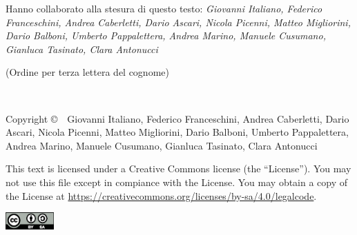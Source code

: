 \documentclass[a4paper,oneside,notoc]{tufte-book}
\theoremstyle{importante}
\begin{document}
\newpage
\newcommand{\contributori}{Giovanni Italiano, Federico Franceschini,
  Andrea Caberletti, Dario Ascari, Nicola Picenni, Matteo Migliorini,
  Dario Balboni, Umberto Pappalettera, Andrea Marino, Manuele Cusumano,
  Gianluca Tasinato, Clara Antonucci}
\begin{fullwidth}
\begin{doublespace}
  \thispagestyle{empty}
  \setlength{\parindent}{0pt}
  \setlength{\parskip}{\baselineskip}
  {\justify
  \noindent\fontsize{16}{16}\selectfont\scshape
  \par\nohyphenation\noindent Hanno collaborato alla stesura di questo testo:
  \itshape\contributori

  (Ordine per terza lettera del cognome)
  }
\end{doublespace}

~\vfill
\thispagestyle{empty}
\setlength{\parindent}{0pt}
\setlength{\parskip}{\baselineskip}
{
  \justify
  \par\nohyphenation Copyright \copyright\ \the\year\ \contributori
}


\par{}

\par\justify\nohyphenation This text is licensed under a Creative Commons
license (the ``License''). You may not use this file
except in compiance with the License. You may obtain a
copy of the License at \url{https://creativecommons.org/licenses/by-sa/4.0/legalcode}.

\includegraphics[width=5em]{by-sa.eps}

\end{fullwidth}

{
  \newpage
  \makeatletter
  \patchcmd{\@makeschapterhead}
  {\raggedright}
  {\centering}
  {}
  {}
  \renewcommand{\contentsname}{\vskip -4.0em{~\hfill\normalfont\Huge\textsc{Indice dei Contenuti}\hfill~}\vskip -2.0em}
  \tableofcontents
  \makeatother
}

\end{document}
